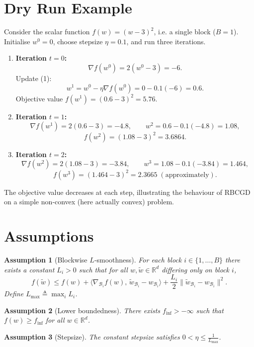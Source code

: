 \documentclass{article}
\newtheorem{assumption}{Assumption}
\newcommand{\R}{\mathbb{R}}
\begin{document}
\section*{Dry Run Example}
Consider the scalar function $f(w)=(w-3)^{2}$, i.e. a single block
($B=1$).  Initialise $w^{0}=0$, choose stepsize $\eta=0.1$, and run three
iterations.

\begin{enumerate}[label=\arabic*.]
\item \textbf{Iteration $t=0$:}
\[
\nabla f(w^{0}) = 2(w^{0}-3)= -6.
\]
Update (1):
\[
w^{1}= w^{0}-\eta\nabla f(w^{0})=0-0.1(-6)=0.6.
\]
Objective value $f(w^{1})=(0.6-3)^{2}=5.76$.

\item \textbf{Iteration $t=1$:}
\[
\nabla f(w^{1}) = 2(0.6-3)= -4.8,\qquad
w^{2}=0.6-0.1(-4.8)=1.08,
\]
\[
f(w^{2})=(1.08-3)^{2}=3.6864.
\]

\item \textbf{Iteration $t=2$:}
\[
\nabla f(w^{2}) = 2(1.08-3)= -3.84,\qquad
w^{3}=1.08-0.1(-3.84)=1.464,
\]
\[
f(w^{3})=(1.464-3)^{2}=2.3665\;(\text{approximately}).
\]
\end{enumerate}
The objective value decreases at each step, illustrating the
behaviour of RBCGD on a simple non‑convex (here actually convex) problem.

\newpage
\section*{Assumptions}
\begin{assumption}[Blockwise $L$‑smoothness]\label{ass:smooth}
For each block $i\in\{1,\dots ,B\}$ there exists a constant $L_{i}>0$ such that
for all $w,\tilde w\in\R^{d}$ differing only on block $i$,
\[
f(\tilde w)\le f(w)+\langle \nabla_{\mathcal{B}_{i}}f(w),\,
\tilde w_{\mathcal{B}_{i}}-w_{\mathcal{B}_{i}}\rangle
+\frac{L_{i}}{2}\|\tilde w_{\mathcal{B}_{i}}-w_{\mathcal{B}_{i}}\|^{2}.
\tag{2}
\]
Define $L_{\max}\triangleq\max_{i}L_{i}$.
\end{assumption}

\begin{assumption}[Lower boundedness]\label{ass:lb}
There exists $f_{\inf}>-\infty$ such that $f(w)\ge f_{\inf}$ for all $w\in\R^{d}$.
\end{assumption}

\begin{assumption}[Stepsize]\label{ass:stepsize}
The constant stepsize satisfies $0<\eta\le \frac{1}{L_{\max}}$.
\end{assumption}
\end{document}
